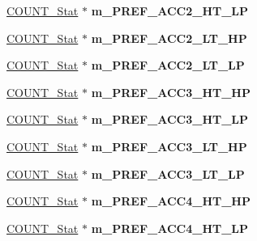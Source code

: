 \begin{DoxyCompactItemize}
\item 
\hypertarget{classall__stats__c_a944d8ce42395d8a5d0720791056bf940}{
\hyperlink{classCOUNT__Stat}{COUNT\_\-Stat} $\ast$ {\bfseries m\_\-PREF\_\-ACC2\_\-HT\_\-LP}}
\label{classall__stats__c_a944d8ce42395d8a5d0720791056bf940}

\item 
\hypertarget{classall__stats__c_a846d2dcf8ab292ce16234f4ece49588b}{
\hyperlink{classCOUNT__Stat}{COUNT\_\-Stat} $\ast$ {\bfseries m\_\-PREF\_\-ACC2\_\-LT\_\-HP}}
\label{classall__stats__c_a846d2dcf8ab292ce16234f4ece49588b}

\item 
\hypertarget{classall__stats__c_a33612c9910c5707a6bd27bd32bf6c620}{
\hyperlink{classCOUNT__Stat}{COUNT\_\-Stat} $\ast$ {\bfseries m\_\-PREF\_\-ACC2\_\-LT\_\-LP}}
\label{classall__stats__c_a33612c9910c5707a6bd27bd32bf6c620}

\item 
\hypertarget{classall__stats__c_a0ddf781050be098f92eb460791ab4335}{
\hyperlink{classCOUNT__Stat}{COUNT\_\-Stat} $\ast$ {\bfseries m\_\-PREF\_\-ACC3\_\-HT\_\-HP}}
\label{classall__stats__c_a0ddf781050be098f92eb460791ab4335}

\item 
\hypertarget{classall__stats__c_af3af53aa19d105ce2162b0f2c80d7b02}{
\hyperlink{classCOUNT__Stat}{COUNT\_\-Stat} $\ast$ {\bfseries m\_\-PREF\_\-ACC3\_\-HT\_\-LP}}
\label{classall__stats__c_af3af53aa19d105ce2162b0f2c80d7b02}

\item 
\hypertarget{classall__stats__c_a3aacc35055e5cd4f171cbeb8c00c3d1a}{
\hyperlink{classCOUNT__Stat}{COUNT\_\-Stat} $\ast$ {\bfseries m\_\-PREF\_\-ACC3\_\-LT\_\-HP}}
\label{classall__stats__c_a3aacc35055e5cd4f171cbeb8c00c3d1a}

\item 
\hypertarget{classall__stats__c_a7f028a365413c35373219d589a1d21fe}{
\hyperlink{classCOUNT__Stat}{COUNT\_\-Stat} $\ast$ {\bfseries m\_\-PREF\_\-ACC3\_\-LT\_\-LP}}
\label{classall__stats__c_a7f028a365413c35373219d589a1d21fe}

\item 
\hypertarget{classall__stats__c_a3c55bf7c8b28e97cc67dee8efda7c277}{
\hyperlink{classCOUNT__Stat}{COUNT\_\-Stat} $\ast$ {\bfseries m\_\-PREF\_\-ACC4\_\-HT\_\-HP}}
\label{classall__stats__c_a3c55bf7c8b28e97cc67dee8efda7c277}

\item 
\hypertarget{classall__stats__c_aaf37455e869755bbbe8f81ff93fd2919}{
\hyperlink{classCOUNT__Stat}{COUNT\_\-Stat} $\ast$ {\bfseries m\_\-PREF\_\-ACC4\_\-HT\_\-LP}}
\label{classall__stats__c_aaf37455e869755bbbe8f81ff93fd2919}


\end{DoxyCompactItemize}
